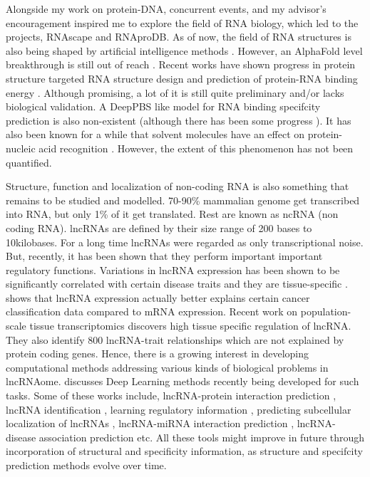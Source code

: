 Alongside my work on protein-DNA, concurrent events, and my advisor's encouragement inspired me to explore the field of RNA biology, which led to the projects, RNAscape and RNAproDB. As of now, the field of RNA structures is also being shaped by artificial intelligence methods \citep{he2024ribonanza}. However, an AlphaFold level breakthrough is still out of reach \citep{schneider2023will}. Recent works have shown progress in protein structure targeted RNA structure design \citep{nori2024rnaflow} and prediction of protein-RNA binding energy \citep{han2024copra}. Although promising, a lot of it is still quite preliminary and/or lacks biological validation. A DeepPBS like model for RNA binding specifcity prediction is also non-existent (although there has been some progress \citep{Lam2019}). It has also been known for a while that solvent molecules have an effect on protein-nucleic acid recognition \citep{Otwinowski1988}. However, the extent of this phenomenon has not been quantified.

Structure, function and localization of non-coding RNA is also something that remains to be studied and modelled. 70-90\% mammalian genome get transcribed into RNA, but only 1\% of it get translated. Rest are known as ncRNA (non coding RNA). lncRNAs are defined by their size range of 200 bases to 10kilobases. For a long time lncRNAs were regarded as only transcriptional noise. But, recently, it has been shown that they perform important important regulatory functions. Variations in lncRNA expression has been shown to be significantly correlated with certain disease traits \citep{wapinski2011long} and they are tissue-specific \citep{seifuddin2020lncrnakb}. 
\citet{al2019long} shows that lncRNA expression actually better explains certain cancer
classification data compared to mRNA expression. Recent work on population-scale tissue transcriptomics \citep{de2021population} discovers high tissue specific regulation of lncRNA. They also identify 800 lncRNA-trait relationships which are not explained by protein coding genes. Hence, there is a growing interest in developing computational methods addressing various kinds of biological problems in lncRNAome. \citet{alam2020deep} discusses Deep Learning methods recently being developed for
such tasks. Some of these works include, lncRNA-protein interaction prediction
\citep{pan2016ipminer, zhao2018bipartite, yi2018deep, zhan2019bgfe, peng2019rpiter}, lncRNA  identification \citep{baek2018lncrnanet,yang2018lncadeep, tripathi2016deeplnc},
learning regulatory information \citep{alam2019deepcnpp, alam2019deepel}, predicting subcellular localization of lncRNAs \citep{gudenas2018prediction},    lncRNA-miRNA interaction prediction \citep{huang2019predicting}, lncRNA-disease association prediction \citep{hu2019deep, xuan2019dual, al2019long, xuan2019graph} etc. All these tools might improve in future through incorporation of structural and specificity information, as structure and specifcity prediction methods evolve over time.

